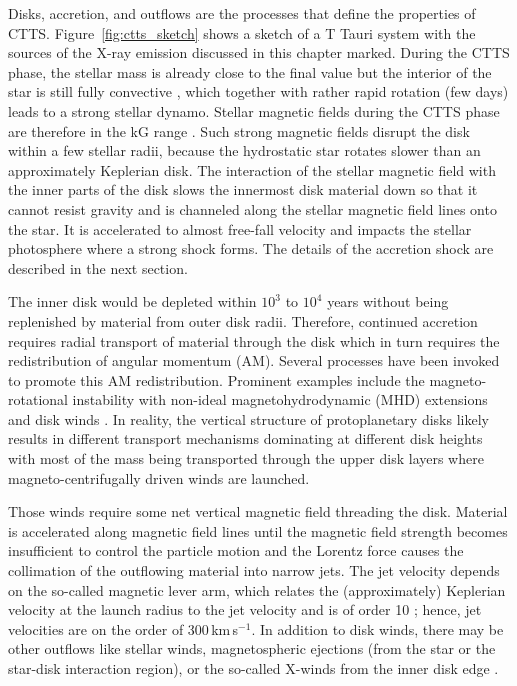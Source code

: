 \documentclass[graybox, nosecnum]{svmult}
\begin{document}
Disks, accretion, and outflows are the processes that define the properties of CTTS. Figure~\ref{fig:ctts_sketch} shows a sketch of a T Tauri system with the sources of the X-ray emission discussed in this chapter marked.
During the CTTS phase, the stellar mass is already close to the final value but the interior of the star is still fully convective \citep{Stahler_2004}, which together with rather rapid rotation (few days) leads to a strong stellar dynamo. Stellar magnetic fields during the CTTS phase are therefore in the kG range \cite{2008MNRAS.386.1234D,2010MNRAS.402.1426D}. Such strong magnetic fields disrupt the disk within a few stellar radii, because the hydrostatic star rotates slower than an approximately Keplerian disk. The interaction of the stellar magnetic field with the inner parts of the disk slows the innermost disk material down so that it cannot resist gravity and is channeled along the stellar magnetic field lines onto the star. It is accelerated to almost free-fall velocity and impacts the stellar photosphere where a strong shock forms. The details of the accretion shock are described in the next section.

The inner disk would be depleted within $10^3$ to $10^4$ years without being replenished by material from outer disk radii. Therefore, continued accretion requires radial transport of material through the disk which in turn requires the redistribution of angular momentum (AM). Several processes have been invoked to promote this AM redistribution. Prominent examples include the magneto-rotational instability \citep[MRI,][]{Balbus_1991} with non-ideal magnetohydrodynamic (MHD) extensions and disk winds \citep{Blandford_1982, Pudritz_1983}. In reality, the vertical structure of protoplanetary disks likely results in different transport mechanisms dominating at different disk heights with most of the mass being transported through the upper disk layers where magneto-centrifugally driven winds are launched.

Those winds require some net vertical magnetic field threading the disk. Material is accelerated along magnetic field lines until the magnetic field strength becomes insufficient to control the particle motion and the Lorentz force causes the collimation of the outflowing material into narrow jets. The jet velocity depends on the so-called magnetic lever arm, which relates the (approximately) Keplerian velocity at the launch radius to the jet velocity and is of order 10 \citep{Ferreira_2006}; hence, jet velocities are on the order of 300\,km\,s$^{-1}$. In addition to disk winds, there may be other outflows like stellar winds, magnetospheric ejections (from the star or the star-disk interaction region), or the so-called X-winds from the inner disk edge \citep{Shu_1994}.
\end{document}
